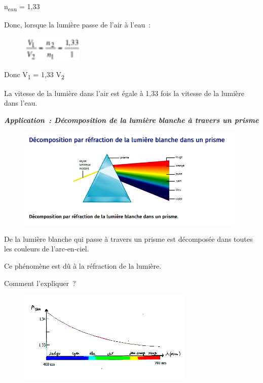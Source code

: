 n\textsubscript{eau} = 1,33

Donc, lorsque la lumière passe de l'air à l'eau~:

\begin{figure}
\centering
\includegraphics[width=2.926cm,height=1.221cm]{Pictures/10000001000000370000001779D0BDD76E1DB000.png}
\caption{}
\end{figure}

Donc V\textsubscript{1} = 1,33 V\textsubscript{2}

La vitesse de la lumière dans l'air est égale à 1,33 fois la vitesse de
la lumière dans l'eau.

\emph{\textbf{Application~: Décomposition de la lumière blanche à
travers un prisme}}

\begin{figure}
\centering
\includegraphics[width=10.968cm,height=4.81cm]{Pictures/10000001000002B20000012EAEC8536EF5F347C3.png}
\caption{}
\end{figure}

De la lumière blanche qui passe à travers un prisme est décomposée dans
toutes les couleurs de l'arc-en-ciel.

Ce phénomène est dû à la réfraction de la lumière.

Comment l'expliquer~?

\begin{figure}
\centering
\includegraphics[width=8.366cm,height=4.369cm]{Pictures/1000000100000257000001392831DE60F0A491E3.png}
\caption{}
\end{figure}

